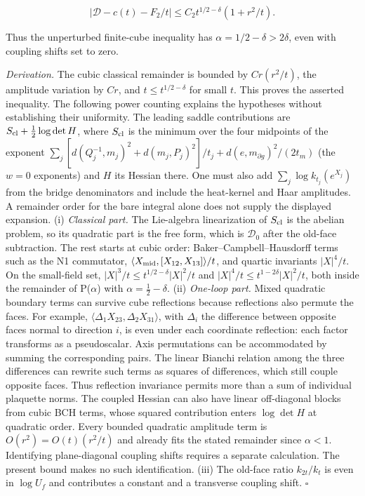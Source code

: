 \documentclass[11pt,a4paper]{article}
\begin{document}
\[|\mathcal D-c(t)-F_2/t|\le C_2t^{1/2-\delta}(1+r^2/t).\]

Thus the unperturbed finite-cube inequality has
\(\alpha=1/2-\delta>2\delta\), even with coupling shifts set to zero.

\emph{Derivation.} The cubic classical remainder is bounded by
\(Cr(r^2/t)\), the amplitude variation by \(Cr\), and
\(t\le t^{1/2-\delta}\) for small \(t\). This proves the asserted
inequality. The following power counting explains the hypotheses without
establishing their uniformity. The leading saddle contributions are
\(S_{\rm cl}+\frac12\log\det H\), where \(S_{\rm cl}\) is the minimum
over the four midpoints of the exponent
\(\sum_j[d(Q_j^{-1},m_j)^2+d(m_j,P_j)^2]/t_j+d(e,m_{\partial g})^2/(2t_m)\)
(the \(w=0\) exponents) and \(H\) its Hessian there. One must also add
\(\sum_j\log k_{t_j}(e^{X_j})\) from the bridge denominators and include
the heat-kernel and Haar amplitudes. A remainder order for the bare
integral alone does not supply the displayed expansion. (i)
\emph{Classical part.} The Lie-algebra linearization of \(S_{\rm cl}\)
is the abelian problem, so its quadratic part is the free form, which is
\(\mathcal D_0\) after the old-face subtraction. The rest starts at
cubic order: Baker--Campbell--Hausdorff terms such as the N1 commutator,
\(\langle X_{\rm mid},[X_{12},X_{13}]\rangle/t\), and quartic invariants
\(|X|^4/t\). On the small-field set,
\(|X|^3/t\le t^{1/2-\delta}|X|^2/t\) and
\(|X|^4/t\le t^{1-2\delta}|X|^2/t\), both inside the remainder of
P(\(\alpha\)) with \(\alpha=\frac12-\delta\). (ii) \emph{One-loop part.}
Mixed quadratic boundary terms can survive cube reflections because
reflections also permute the faces. For example,
\(\langle\Delta_1X_{23},\Delta_2X_{31}\rangle\), with \(\Delta_i\) the
difference between opposite faces normal to direction \(i\), is even
under each coordinate reflection: each factor transforms as a
pseudoscalar. Axis permutations can be accommodated by summing the
corresponding pairs. The linear Bianchi relation among the three
differences can rewrite such terms as squares of differences, which
still couple opposite faces. Thus reflection invariance permits more
than a sum of individual plaquette norms. The coupled Hessian can also
have linear off-diagonal blocks from cubic BCH terms, whose squared
contribution enters \(\log\det H\) at quadratic order. Every bounded
quadratic amplitude term is \(O(r^2)=O(t)(r^2/t)\) and already fits the
stated remainder since \(\alpha<1\). Identifying plane-diagonal coupling
shifts requires a separate calculation. The present bound makes no such
identification. (iii) The old-face ratio \(k_{2t}/k_t\) is even in
\(\log U_f\) and contributes a constant and a transverse coupling shift.
\(\square\)
\end{document}
